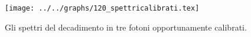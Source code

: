 \begin{figure}[h] \centering\texttt{[image: ../../graphs/120\_spettricalibrati.tex]}\caption{Gli spettri del decadimento in tre fotoni opportunamente calibrati. }\label{gr:120_spettricalibrati} \end{figure}
